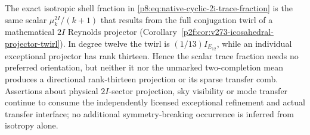 \documentclass[12pt,a4paper]{article}
\begin{document}
\begin{remark}
\label{p8:rem:v273-shell-twirl-projector-firewall}
The exact isotropic shell fraction in
\eqref{p8:eq:native-cyclic-2i-trace-fraction} is the same scalar
$\mu_k^{2I}/(k+1)$ that results from the full conjugation twirl of a
mathematical $2I$ Reynolds projector
(Corollary~\ref{p2f:cor:v273-icosahedral-projector-twirl}).
In degree twelve the twirl is $(1/13)I_{E_{12}}$, while an individual
exceptional projector has rank thirteen. Hence the scalar trace
fraction needs no preferred orientation, but neither it nor the
unmarked two-completion mean produces a directional rank-thirteen
projection or its sparse transfer comb. Assertions about physical
$2I$-sector projection, sky visibility or mode transfer continue to
consume the independently licensed exceptional refinement and
actual transfer interface; no additional symmetry-breaking occurrence
is inferred from isotropy alone.
\end{remark}




\end{document}
